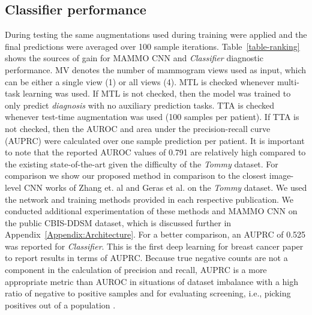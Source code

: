 \documentclass[journal]{IEEEtran}
\begin{document}
\subsection{Classifier performance}

During testing the same augmentations used during training were applied and the final predictions were averaged over 100 sample iterations.  Table~\ref{table-ranking} shows the sources of gain for MAMMO CNN and \textit{Classifier} diagnostic performance.  MV denotes the number of mammogram views used as input, which can be either a single view (1) or all views (4).  MTL is checked whenever multi-task learning was used.  If MTL is not checked, then the model was trained to only predict \textit{diagnosis} with no auxiliary prediction tasks.  TTA is checked whenever test-time augmentation was used (100 samples per patient). If TTA is not checked, then the AUROC and area under the precision-recall curve (AUPRC) were calculated over one sample prediction per patient. It is important to note that the reported AUROC values of 0.791 are relatively high compared to the existing state-of-the-art given the difficulty of the \textit{Tommy} dataset. For comparison we show our proposed method in comparison to the closest image-level CNN works of Zhang et. al \cite{fullimage-zhang} and Geras et al. \cite{krysztof-etal-2017} on the \textit{Tommy} dataset. We used the network and training methods provided in each respective publication.  We conducted additional experimentation of these methods and MAMMO CNN on the public CBIS-DDSM dataset, which is discussed further in Appendix~\ref{Appendix:Architecture}. For a better comparison, an AUPRC of 0.525 was reported for  \textit{Classifier}.  This is the first deep learning for breast cancer paper to report results in terms of AUPRC.  Because true negative counts are not a component in the calculation of precision and recall, AUPRC is a more appropriate metric than AUROC in situations of dataset imbalance with a high ratio of negative to positive samples and for evaluating screening, i.e., picking positives out of a population \cite{AUPRC-2015, AUPRC-2006}.
 
\end{document}
